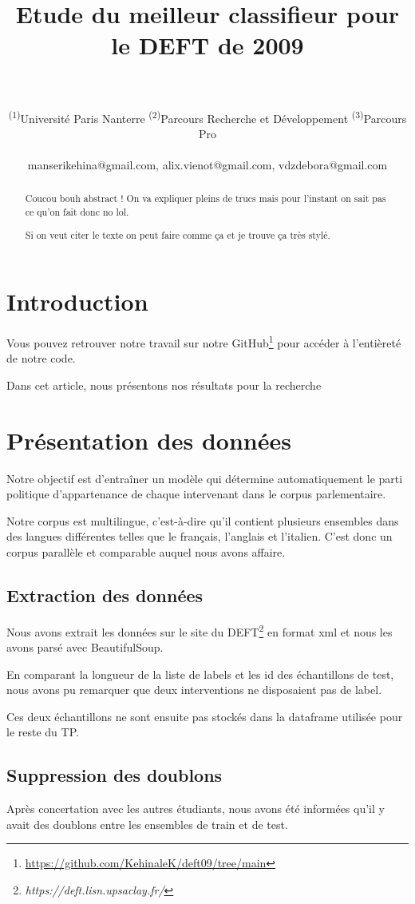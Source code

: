 \documentclass[11pt]{article}
\title{Etude du meilleur classifieur pour le DEFT de 2009}
\author{
  \text{MANSERI Kéhina\textsuperscript{(1)(2)}}
  \text{SIRVEN-VIENOT Alix\textsuperscript{(1)(2)}}
  \text{VAN-DEN-ZANDE Débora\textsuperscript{(1)(3)}}
\\
\\
  \textsuperscript{(1)}Université Paris Nanterre
  \textsuperscript{(2)}Parcours Recherche et Développement
  \textsuperscript{(3)}Parcours Pro
\\
\\
    \small {
    manserikehina@gmail.com, alix.vienot@gmail.com, vdzdebora@gmail.com
    }
\\
}
\begin{document}
\maketitle
\begin{abstract}
Coucou bouh abstract ! On va expliquer pleins de trucs mais pour l'instant on sait pas ce qu'on fait donc no lol.

Si on veut citer le texte on peut faire comme ça \cite{forest2009variation} et je trouve ça très stylé.

\end{abstract}

\section{Introduction}
Vous pouvez retrouver notre travail sur notre GitHub\footnote{\url{https://github.com/KehinaleK/deft09/tree/main}} pour accéder à l'entièreté de notre code.

Dans cet article, nous présentons nos résultats pour la recherche 

\section{Présentation des données}

Notre objectif est d'entraîner un modèle qui détermine automatiquement le parti politique d’appartenance de chaque intervenant dans le corpus parlementaire. 

Notre corpus est multilingue, c'est-à-dire qu'il contient plusieurs ensembles dans des langues différentes telles que le français, l'anglais et l'italien. C'est donc un corpus parallèle et comparable auquel nous avons affaire. 

\subsection{Extraction des données}
Nous avons extrait les données sur le site du DEFT\footnote{\textit{https://deft.lisn.upsaclay.fr/}} en format xml et nous les avons parsé avec BeautifulSoup. 

En comparant la longueur de la liste de labels et les id des échantillons de test, nous avons pu remarquer que deux interventions ne disposaient pas de label.

Ces deux échantillons ne sont ensuite pas stockés dans la dataframe utilisée pour le reste du TP.



\subsection{Suppression des doublons}
Après concertation avec les autres étudiants, nous avons été informées qu'il y avait des doublons entre les ensembles de train et de test.
\end{document}
